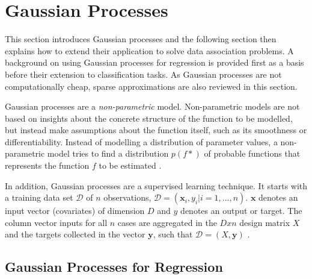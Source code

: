 \documentclass[12pt,a4paper]{report}
\theoremstyle{definition}
\begin{document}
\section{Gaussian Processes}

This section introduces Gaussian processes and the following section then explains how to extend their application to solve data association problems. 
A background on using Gaussian processes for regression is provided first as a basis before their extension to classification tasks. 
As Gaussian processes are not computationally cheap, sparse approximations are also reviewed in this section.

Gaussian processes are a \emph{non-parametric} model. 
Non-parametric models are not based on insights about the concrete structure of the function to be modelled, but instead make assumptions about the function itself, such as its smoothness or differentiability. 
Instead of modelling a distribution of parameter values, a non-parametric model tries to find a distribution $p(f*)$ of probable functions that represents the function $f$ to be estimated \citep{Kaiser2017}.

In addition, Gaussian processes are a supervised learning technique. 
It starts with a training data set $\mathcal{D}$ of $n$ observations, $\mathcal{D} = (\textbf{x}_{i}, y_{i} | i = 1, ..., n)$.
$\textbf{x}$ denotes an input vector (covariates) of dimension $D$ and $y$ denotes an output or target. 
The column vector inputs for all $n$ cases are aggregated in the $D x n$ design matrix $X$ and the targets collected in the vector $\textbf{y}$, such that $\mathcal{D} = (X, \textbf{y})$ \citep{RasmussenWilliams2006}.

\subsection{Gaussian Processes for Regression}



%
\end{document}
